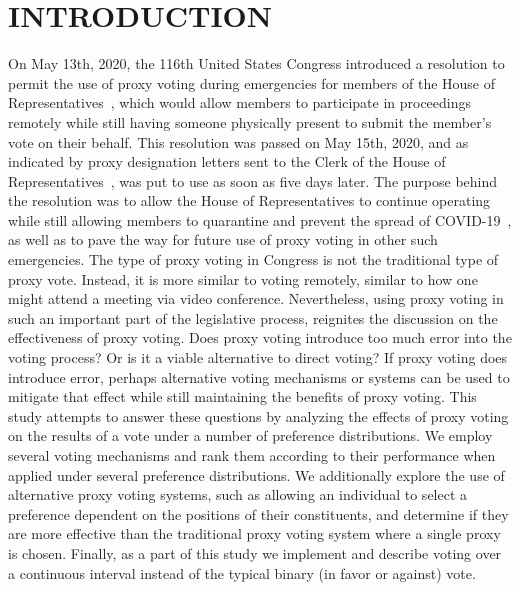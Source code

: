 %
%

\chapter{INTRODUCTION}\label{ch:introduction}
\thispagestyle{empty}
On May 13th, 2020, the 116th United States Congress introduced a resolution
to permit the use of proxy voting during emergencies for members of the House of
Representatives~\cite{Congress.gov2020}, which would allow members to participate in
proceedings remotely while still having someone physically present to submit the
member's vote on their behalf.
This resolution was passed on May 15th, 2020, and as indicated by proxy designation
letters sent to the Clerk of the House of Representatives~\cite{Clerk.House.gov2022},
was put to use as soon as five days later.
The purpose behind the resolution was to allow the House of Representatives
to continue operating while still allowing members to quarantine and prevent the
spread of COVID-19~\cite{Congress.gov2020}, as well as to pave the way for future use
of proxy voting in other such emergencies.
The type of proxy voting in Congress is not the traditional type of proxy vote.
Instead, it is more similar to voting remotely, similar to how one might attend a
meeting via video conference.
Nevertheless, using proxy voting in such an important part of the legislative process,
reignites the discussion on the effectiveness of proxy voting.
Does proxy voting introduce too much error into the voting process?
Or is it a viable alternative to direct voting?
If proxy voting does introduce error, perhaps alternative voting mechanisms or systems
can be used to mitigate that effect while still maintaining the benefits of proxy
voting.
This study attempts to answer these questions by analyzing the effects of proxy
voting on the results of a vote under a number of preference distributions.
We employ several voting mechanisms and rank them according to their performance when
applied under several preference distributions.
We additionally explore the use of alternative proxy voting systems, such as
allowing an individual to select a preference dependent on the positions of their
constituents, and determine if they are more effective than the traditional proxy
voting system where a single proxy is chosen.
Finally, as a part of this study we implement and describe voting over a continuous
interval instead of the typical binary (in favor or against) vote.


